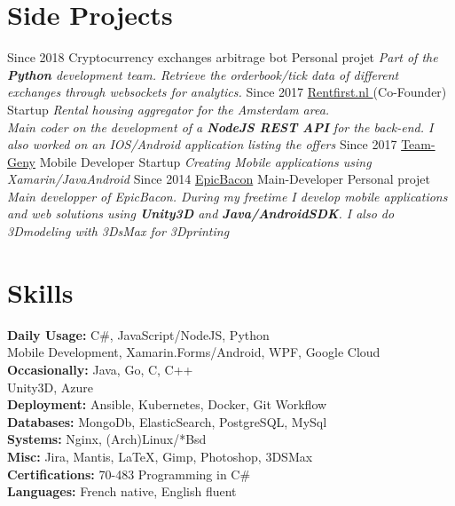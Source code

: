 \documentclass{emonides-cv}
\begin{document}
\vspace{1.5cm}

\section{Side Projects}
\begin{entrylist}
  \entry
    {Since  2018}
    {Cryptocurrency exchanges arbitrage bot {\normalfont }}
    {Personal projet}
    {\emph{Part of the \textbf{Python} development team. Retrieve the orderbook/tick data of different exchanges through websockets for analytics. }}
  \entry
    {Since  2017}
    {\href{https://www.Rentfirst.nl/}{Rentfirst.nl  } {\normalfont  (Co-Founder)}}
    {Startup}
    {\emph{Rental housing aggregator for the Amsterdam area. \\
    Main coder on the development of a \textbf{NodeJS REST API} for the back-end.
    I also worked on an IOS/Android application listing the offers}}
  \entry
    {Since  2017}
    {\href{http://www.teamgeny.com/}{Team-Geny} {\normalfont Mobile Developer}}
    {Startup}
    {\emph{Creating Mobile applications using Xamarin/JavaAndroid}}
  \entry
    {Since  2014}
    {\href{https://play.google.com/store/apps/developer?id=EpicBacon}{EpicBacon} {\normalfont Main-Developer}}
    {Personal projet}
    {\emph{Main developper of EpicBacon. During my freetime I develop mobile applications and web solutions using \textbf{Unity3D} and \textbf{Java/AndroidSDK}.
    I also do 3Dmodeling with 3DsMax for 3Dprinting  }}
\end{entrylist}
\section{Skills}
\normalsize
\textbf {Daily Usage:}   C\#, JavaScript/NodeJS, Python\\
\normalsize {  Mobile Development, Xamarin.Forms/Android, WPF, Google Cloud}\\
\textbf {Occasionally:} Java, Go, C, C++ \\
Unity3D, Azure\\
\textbf {Deployment:} Ansible, Kubernetes, Docker, Git Workflow\\
\textbf {Databases:} MongoDb, ElasticSearch, PostgreSQL, MySql\\
\textbf {Systems:} Nginx, (Arch)Linux/*Bsd \\
\textbf {Misc:} Jira, Mantis, \LaTeX, Gimp, Photoshop, 3DSMax\\
\textbf { Certifications: } 70-483 Programming in C\#\\
\textbf { Languages: } French native, English fluent
\end{document}

